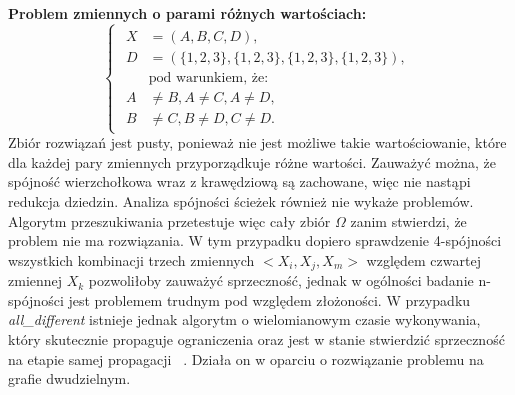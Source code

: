 \begin{example}
\textbf{Problem zmiennych o parami różnych wartościach:}
\begin{equation}
    \begin{cases}
        \begin{aligned}
            X &= (A, B, C, D), \\
            D &= (\{1, 2, 3\}, \{1, 2, 3\}, \{1, 2, 3\}, \{1, 2, 3\}), \\
            &\text{pod warunkiem, że:} \\
            A &\neq B, A \neq C, A \neq D, \\
            B &\neq C, B \neq D, C \neq D.
        \end{aligned}
    \end{cases}
\end{equation}
Zbiór rozwiązań jest pusty, ponieważ nie jest możliwe takie wartościowanie, które dla każdej pary zmiennych przyporządkuje różne
wartości. Zauważyć można, że spójność wierzchołkowa wraz z krawędziową są zachowane, więc nie nastąpi redukcja dziedzin.
Analiza spójności ścieżek również nie wykaże problemów. Algorytm przeszukiwania przetestuje więc cały zbiór $\Omega$ zanim
stwierdzi, że problem nie ma rozwiązania. W tym przypadku dopiero sprawdzenie 4-spójności wszystkich kombinacji trzech zmiennych
$<X_i, X_j, X_m>$ względem czwartej zmiennej $X_k$ pozwoliłoby zauważyć sprzeczność, jednak w ogólności badanie n-spójności jest
problemem trudnym pod względem złożoności. W przypadku \textit{all\_different} istnieje jednak algorytm o wielomianowym czasie 
wykonywania, który skutecznie propaguje ograniczenia oraz jest w stanie stwierdzić sprzeczność na etapie samej propagacji~
\cite{Filtering}. Działa on w oparciu o rozwiązanie problemu na grafie dwudzielnym.
\end{example}

